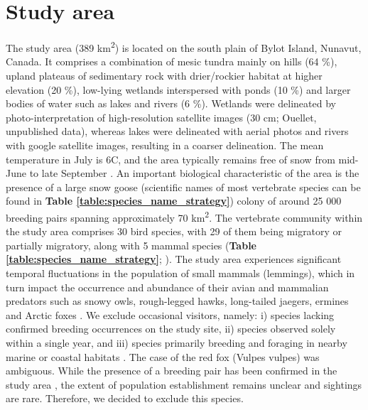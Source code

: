 \documentclass[a4paper,twoside,10pt]{article}
\begin{document}
\section{Study area}
The study area (389 km\textsuperscript{2}) is located on the south plain of Bylot Island, Nunavut, Canada. It comprises a combination of mesic tundra mainly on hills (64 \%), upland plateaus of sedimentary rock with drier/rockier habitat at higher elevation (20 \%), low-lying wetlands interspersed with ponds (10 \%) and larger bodies of water such as lakes and rivers (6 \%). Wetlands were delineated by photo-interpretation of high-resolution satellite images (30 cm; Ouellet, unpublished data), whereas lakes were delineated with aerial photos and rivers with google satellite images, resulting in a coarser delineation. The mean temperature in July is 6\textdegree C, and the area typically remains free of snow from mid-June to late September \citep{gauthier2013}. An important biological characteristic of the area is the presence of a large snow goose (scientific names of most vertebrate species can be found in \textbf{Table \ref{table:species_name_strategy}}) colony of around 25 000 breeding pairs \citep{reed2002} spanning approximately 70 km\textsuperscript{2}. The vertebrate community within the study area comprises 30 bird species, with 29 of them being migratory or partially migratory, along with 5 mammal species (\textbf{Table \ref{table:species_name_strategy}}; \citet{moisan2023, gauthier2024a}). The study area experiences significant temporal fluctuations in the population of small mammals (lemmings), which in turn impact the occurrence and abundance of their avian and mammalian predators such as snowy owls, rough-legged hawks, long-tailed jaegers, ermines and Arctic foxes \citep{legagneux2012}. We exclude occasional visitors, namely: i) species lacking confirmed breeding occurrences on the study site, ii) species observed solely within a single year, and iii) species primarily breeding and foraging in nearby marine or coastal habitats \citep{moisan2023}. The case of the red fox (Vulpes vulpes) was ambiguous. While the presence of a breeding pair has been confirmed in the study area \citep{lai2022}, the extent of population establishment remains unclear and sightings are rare. Therefore, we decided to exclude this species.
\end{document}
